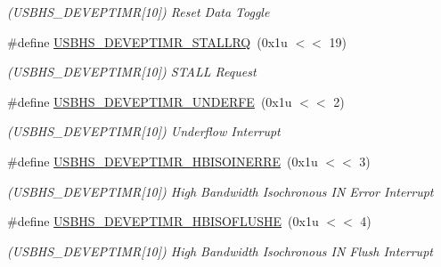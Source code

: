 \begin{DoxyCompactItemize}
\begin{DoxyCompactList}\small\item\em (U\+S\+B\+H\+S\+\_\+\+D\+E\+V\+E\+P\+T\+I\+MR\mbox{[}10\mbox{]}) Reset Data Toggle \end{DoxyCompactList}\item 
\mbox{\label{group__SAME70__USBHS_ga9303a4c0d94535f879eec79d44321a5f}} 
\#define \mbox{\hyperlink{group__SAME70__USBHS_ga9303a4c0d94535f879eec79d44321a5f}{U\+S\+B\+H\+S\+\_\+\+D\+E\+V\+E\+P\+T\+I\+M\+R\+\_\+\+S\+T\+A\+L\+L\+RQ}}~(0x1u $<$$<$ 19)
\begin{DoxyCompactList}\small\item\em (U\+S\+B\+H\+S\+\_\+\+D\+E\+V\+E\+P\+T\+I\+MR\mbox{[}10\mbox{]}) S\+T\+A\+LL Request \end{DoxyCompactList}\item 
\mbox{\label{group__SAME70__USBHS_ga36687100163c9ee32cdf3da0cd3d1bb8}} 
\#define \mbox{\hyperlink{group__SAME70__USBHS_ga36687100163c9ee32cdf3da0cd3d1bb8}{U\+S\+B\+H\+S\+\_\+\+D\+E\+V\+E\+P\+T\+I\+M\+R\+\_\+\+U\+N\+D\+E\+R\+FE}}~(0x1u $<$$<$ 2)
\begin{DoxyCompactList}\small\item\em (U\+S\+B\+H\+S\+\_\+\+D\+E\+V\+E\+P\+T\+I\+MR\mbox{[}10\mbox{]}) Underflow Interrupt \end{DoxyCompactList}\item 
\mbox{\label{group__SAME70__USBHS_ga54e551347b283a2baeaf23522e7eacab}} 
\#define \mbox{\hyperlink{group__SAME70__USBHS_ga54e551347b283a2baeaf23522e7eacab}{U\+S\+B\+H\+S\+\_\+\+D\+E\+V\+E\+P\+T\+I\+M\+R\+\_\+\+H\+B\+I\+S\+O\+I\+N\+E\+R\+RE}}~(0x1u $<$$<$ 3)
\begin{DoxyCompactList}\small\item\em (U\+S\+B\+H\+S\+\_\+\+D\+E\+V\+E\+P\+T\+I\+MR\mbox{[}10\mbox{]}) High Bandwidth Isochronous IN Error Interrupt \end{DoxyCompactList}\item 
\mbox{\label{group__SAME70__USBHS_gaaed6d79e76bd673a011e23626c594991}} 
\#define \mbox{\hyperlink{group__SAME70__USBHS_gaaed6d79e76bd673a011e23626c594991}{U\+S\+B\+H\+S\+\_\+\+D\+E\+V\+E\+P\+T\+I\+M\+R\+\_\+\+H\+B\+I\+S\+O\+F\+L\+U\+S\+HE}}~(0x1u $<$$<$ 4)
\begin{DoxyCompactList}\small\item\em (U\+S\+B\+H\+S\+\_\+\+D\+E\+V\+E\+P\+T\+I\+MR\mbox{[}10\mbox{]}) High Bandwidth Isochronous IN Flush Interrupt \end{DoxyCompactList}\item 

\end{DoxyCompactItemize}
